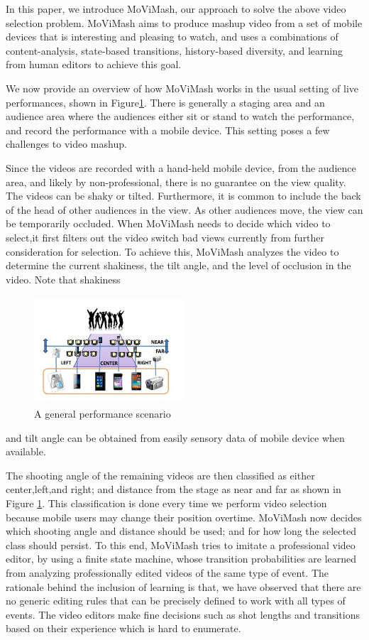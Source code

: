 \documentclass{sig-alternate}
\begin{document}
 In this paper, we introduce MoViMash, our approach to solve the above video selection problem. MoViMash aims to produce mashup video from a set of mobile devices that is interesting and pleasing to watch, and uses a combinations of content-analysis, state-based transitions, history-based diversity, and learning from human editors to achieve this goal.

 We now provide an overview of how MoViMash works in the usual setting of live performances, shown in Figure\ref{fig:figure1}. There is generally a staging area and an audience area where the audiences either sit or stand to watch the performance, and record the performance with a mobile device. This setting poses a few challenges to video mashup.

 Since the videos are recorded with a hand-held mobile device, from the audience area, and likely by non-professional, there is no guarantee on the view quality. The videos can be shaky or tilted. Furthermore, it is common to include the back of the head of other audiences in the view. As other audiences move, the view can be temporarily occluded. When MoViMash needs to decide which video to select,it first filters out the video switch bad views currently from further consideration for selection. To achieve this, MoViMash analyzes the video to determine the current shakiness, the tilt angle, and the level of occlusion in the video. Note that shakiness
 \begin{figure}[h]
\includegraphics[width=0.5\textwidth ,height = 4cm]{image1}
\caption{A general performance scenario}
\label{fig:figure1}
\end{figure}
and tilt angle can be obtained from easily sensory data of mobile device when available. 

The shooting angle of the remaining videos are then classiﬁed as either center,left,and right; and distance from the stage as near and far as shown in Figure \ref{fig:figure1}. This classiﬁcation is done every time we perform video selection because mobile users may change their position overtime. MoViMash now decides which shooting angle and distance should be used; and for how long the selected class should persist. To this end, MoViMash tries to imitate a professional video editor, by using a ﬁnite state machine, whose transition probabilities are learned from analyzing professionally edited videos of the same type of event. The rationale behind the inclusion of learning is that, we have observed that there are no generic editing rules that can be precisely deﬁned to work with all types of events. The video editors make ﬁne decisions such as shot lengths and transitions based on their experience which is hard to enumerate. 
\end{document}
